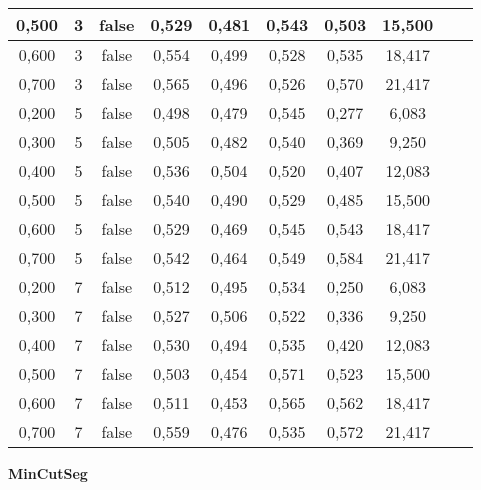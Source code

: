 \documentclass{article}
\begin{document}
\begin{longtable}[c]{|c|c|c|c|c|c|c|c|c|c|}
 0,500 & 3 & false & 0,529 & 0,481 & 0,543 & 0,503 & 15,500  \\ \hline 
 0,600 & 3 & false & 0,554 & 0,499 & 0,528 & 0,535 & 18,417  \\ \hline 
 0,700 & 3 & false & 0,565 & 0,496 & 0,526 & 0,570 & 21,417  \\ \hline 
 0,200 & 5 & false & 0,498 & 0,479 & 0,545 & 0,277 & 6,083  \\ \hline 
 0,300 & 5 & false & 0,505 & 0,482 & 0,540 & 0,369 & 9,250  \\ \hline 
 0,400 & 5 & false & 0,536 & 0,504 & 0,520 & 0,407 & 12,083  \\ \hline 
 0,500 & 5 & false & 0,540 & 0,490 & 0,529 & 0,485 & 15,500  \\ \hline 
 0,600 & 5 & false & 0,529 & 0,469 & 0,545 & 0,543 & 18,417  \\ \hline 
 0,700 & 5 & false & 0,542 & 0,464 & 0,549 & 0,584 & 21,417  \\ \hline 
 0,200 & 7 & false & 0,512 & 0,495 & 0,534 & 0,250 & 6,083  \\ \hline 
 0,300 & 7 & false & 0,527 & 0,506 & 0,522 & 0,336 & 9,250  \\ \hline 
 0,400 & 7 & false & 0,530 & 0,494 & 0,535 & 0,420 & 12,083  \\ \hline 
 0,500 & 7 & false & 0,503 & 0,454 & 0,571 & 0,523 & 15,500  \\ \hline 
 0,600 & 7 & false & 0,511 & 0,453 & 0,565 & 0,562 & 18,417  \\ \hline 
 0,700 & 7 & false & 0,559 & 0,476 & 0,535 & 0,572 & 21,417  \\ \hline 
 \end{longtable} 

\newpage

{  
\large
\center
	\textbf{MinCutSeg}  

}
\end{document}
